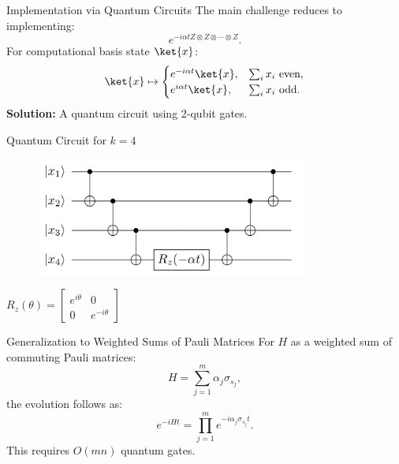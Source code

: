 \documentclass[aspectratio=169,xcolor=dvipsnames]{beamer}
\begin{document}
\begin{frame}{Implementation via Quantum Circuits}
  The main challenge reduces to implementing:
  \begin{equation}
    e^{-i \alpha t Z \otimes Z \otimes \cdots \otimes Z}.
  \end{equation}
  For computational basis state $\ket{x}$:
  \begin{equation}
    \ket{x} \mapsto \begin{cases} 
      e^{-i\alpha t} \ket{x}, & \sum_i x_i \text{ even}, \\
      e^{i\alpha t} \ket{x}, & \sum_i x_i \text{ odd}.
    \end{cases}
  \end{equation}
  \textbf{Solution:} A quantum circuit using 2-qubit gates.
\end{frame}

\begin{frame}{Quantum Circuit for $k=4$}
  \begin{center}
    \begin{figure}[htbp]
      \centering
      \includegraphics[width=0.8\textwidth]{rsc/circuit.png}
    \end{figure}

  \end{center}
  $R_z(\theta) = \begin{bmatrix} e^{i \theta} & 0 \\ 0 & e^{-i \theta} \end{bmatrix}$
\end{frame}

\begin{frame}{Generalization to Weighted Sums of Pauli Matrices}
  For $H$ as a weighted sum of commuting Pauli matrices:
  \begin{equation}
    H = \sum_{j=1}^{m} \alpha_j \sigma_{s_j},
  \end{equation}
  the evolution follows as:
  \begin{equation}
    e^{-i H t} = \prod_{j=1}^{m} e^{-i \alpha_j \sigma_{s_j} t}.
  \end{equation}
  This requires $O(mn)$ quantum gates.
\end{frame}


\end{document}
